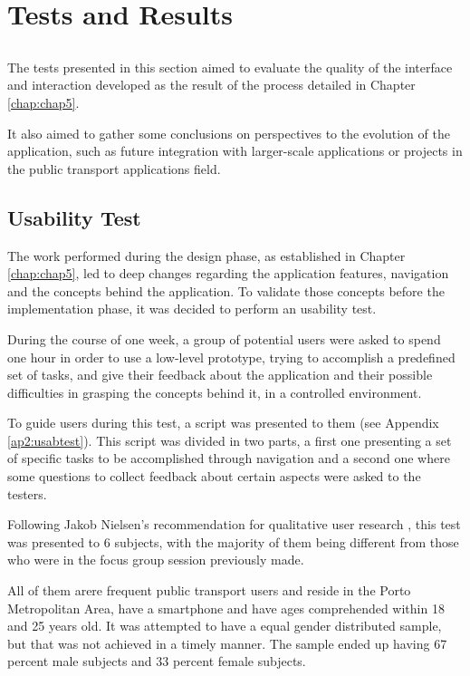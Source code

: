 \chapter{Tests and Results} \label{chap:chap6}

\section*{}

The tests presented in this section aimed to evaluate the quality of the interface and interaction developed as the result of the process detailed in Chapter \ref{chap:chap5}. 

It also aimed to gather some conclusions on perspectives to the evolution of the application, such as future integration with larger-scale applications or projects in the public transport applications field.

\section{Usability Test}

The work performed during the design phase, as established in Chapter \ref{chap:chap5}, led to deep changes regarding the application features, navigation and the concepts behind the application. To validate those concepts before the implementation phase, it was decided to perform an usability test.


During the course of one week, a group of potential users were asked to spend one hour in order to use a low-level prototype, trying to accomplish a predefined set of tasks, and give their feedback about the application and their possible difficulties in grasping the concepts behind it, in a controlled environment.

To guide users during this test, a script was presented to them (see Appendix \ref{ap2:usabtest}). This script was divided in two parts, a first one presenting a set of specific tasks to be accomplished through navigation and a second one where some questions to collect feedback about certain aspects were asked to the testers.

Following Jakob Nielsen's recommendation for qualitative user research \cite{kn:NB12}, this test was presented to 6 subjects, with the majority of them being different from those who were in the focus group session previously made.

All of them arere frequent public transport users and reside in the Porto Metropolitan Area, have a smartphone and have ages comprehended within 18 and 25 years old. It was attempted to have a equal gender distributed sample, but that was not achieved in a timely manner. The sample ended up having 67 percent male subjects and 33 percent female subjects.

